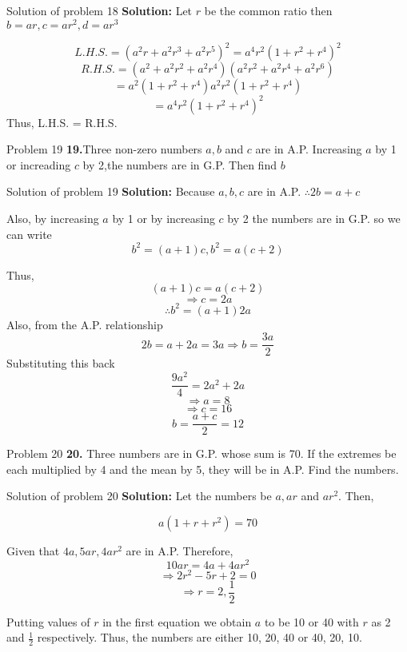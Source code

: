 \documentclass[aspectratio=1610,8pt]{beamer}
\begin{document}
\begin{frame}{Solution of problem 18}
  \textbf{Solution:} Let $r$ be the common ratio then $b = ar, c = ar^2, d =
  ar^3$

  $$L.H.S. = (a^2r + a^2r^3 + a^2r^5)^2 = a^4r^2(1 + r^2 + r^4)^2$$
  $$R.H.S. = (a^2 + a^2r^2 + a^2r^4)(a^2r^2 + a^2r^4 + a^2r^6)$$
  $$= a^2(1 + r^2 + r^4)a^2r^2(1 + r^2 + r^4)$$
  $$= a^4r^2(1 + r^2 + r^4)^2$$
  Thus, L.H.S. = R.H.S.
\end{frame}
\begin{frame}{Problem 19}
  \textbf{19.}Three non-zero numbers $a, b$ and $c$ are in A.P. Increasing $a$
  by 1 or increading $c$ by 2,the numbers are in G.P. Then find $b$
\end{frame}
\begin{frame}{Solution of problem 19}
  \textbf{Solution:} Because $a, b, c$ are in A.P. $\therefore 2b = a + c$

  Also, by increasing $a$ by 1 or by increasing $c$ by 2 the numbers are in
  G.P. so we can write $$b^2 = (a + 1)c, b^2 = a(c + 2)$$

  Thus, $$(a + 1)c = a(c + 2)$$
  $$\Rightarrow c = 2a$$
  $$\therefore b^2 = (a + 1)2a$$
  Also, from the A.P. relationship
  $$2b = a + 2a = 3a \Rightarrow b = \frac{3a}{2}$$
  Substituting this back
  $$\frac{9a^2}{4} = 2a^2 + 2a$$
  $$\Rightarrow a = 8$$
  $$\Rightarrow c = 16$$
  $$b = \frac{a + c}{2} = 12$$
\end{frame}
\begin{frame}{Problem 20}
  \textbf{20.} Three numbers are in G.P. whose sum is 70. If the extremes be
  each multiplied by 4 and the mean by 5, they will be in A.P. Find the numbers.
\end{frame}
\begin{frame}{Solution of problem 20}
  \textbf{Solution:} Let the numbers be $a, ar$ and $ar^2$. Then,

  $$a(1 + r + r^2) = 70$$

  Given that $4a, 5ar, 4ar^2$ are in A.P. Therefore,
  $$10ar = 4a + 4ar^2$$
  $$\Rightarrow 2r^2 - 5r + 2 = 0$$
  $$\Rightarrow r = 2, \frac{1}{2}$$

  Putting values of $r$ in the first equation we obtain $a$ to be 10 or 40 with
  $r$ as 2 and $\frac{1}{2}$ respectively. Thus, the numbers are either 10, 20,
  40 or 40, 20, 10.
\end{frame}
\end{document}
